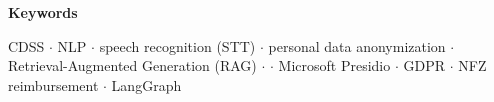 \vspace{1.5cm}

\begin{center}
{\Large\bfseries Keywords\par}
\end{center}

\vspace{0.5cm}

\noindent
CDSS $\cdot$ NLP $\cdot$ speech recognition (STT) $\cdot$ personal data
anonymization $\cdot$ Retrieval-Augmented Generation (RAG) $\cdot$
 $\cdot$ Microsoft Presidio $\cdot$ GDPR $\cdot$
NFZ reimbursement $\cdot$ LangGraph

\cleardoublepage
